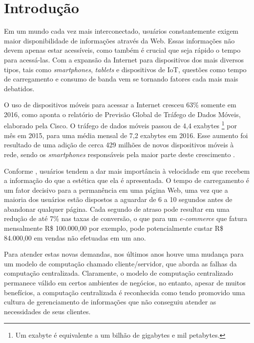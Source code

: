 \chapter[Introdução]{Introdução}

Em um mundo cada vez mais interconectado, usuários constantemente exigem maior disponibilidade de informações através da Web. Essas informações não devem apenas estar acessíveis, como também é crucial que seja rápido o tempo para acessá-las. Com a expansão da Internet para dispositivos dos mais diversos tipos, tais como \textit{smartphones}, \textit{tablets} e dispositivos de IoT, questões como tempo de carregamento e consumo de banda vem se tornando fatores cada mais mais debatidos.

O uso de dispositivos móveis para acessar a Internet cresceu 63\% somente em 2016, como aponta o relatório de Previsão Global de Tráfego de Dados Móveis, elaborado pela Cisco. O tráfego de dados móveis passou de  4,4 exabytes \footnote{Um exabyte é equivalente a um bilhão de gigabytes e mil petabytes.} por mês em 2015, para uma média mensal de 7,2 exabytes em 2016. Esse aumento foi resultado de uma adição de cerca 429 milhões de novos dispositivos móveis à rede, sendo os \textit{smartphones} responsáveis pela maior parte deste crescimento \cite{cisco-network-report}.

Conforme , usuários tendem a dar mais importância à velocidade em que recebem a informação do que a estética que ela é apresentada. O tempo de carregamento é um fator decisivo para a permanência em uma página Web, uma vez que a maioria dos usuários estão dispostos a aguardar de 6 a 10 segundos antes de abandonar qualquer página. Cada segundo de atraso pode resultar em uma redução de até 7\% nas taxas de conversão, o que para um \textit{e-commerce} que fatura mensalmente R\$ 100.000,00 por exemplo, pode potencialmente custar R\$ 84.000,00 em vendas não efetuadas em um ano.

Para atender estas novas demandas, nos últimos anos houve uma mudança para um modelo de computação chamado cliente/servidor, que aborda as falhas da computação centralizada. Claramente, o modelo de computação centralizado permanece válido em certos ambientes de negócios, no entanto, apesar de muitos benefícios, a computação centralizada é reconhecida como tendo promovido uma cultura de gerenciamento de informações que não conseguiu atender as necessidades de seus clientes.

